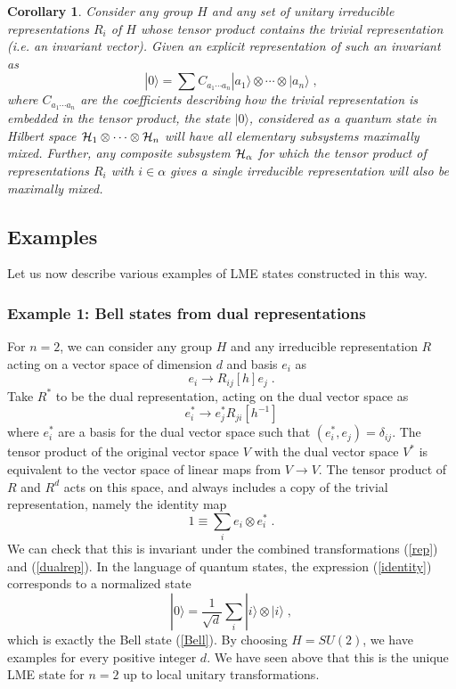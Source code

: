 \documentclass[12pt]{article}
\newtheorem{corollary}[theorem]{Corollary}
\theoremstyle{definition}
\newcommand{\be}{\begin{equation}}
\newcommand{\ee}{\end{equation}}
\begin{document}
\begin{corollary} \label{cor.genstates}
Consider any group $H$ and any set of unitary irreducible representations $R_i$ of $H$ whose tensor product contains the trivial representation (i.e. an invariant vector). Given an explicit representation of such an invariant as
\be
\label{genstates}
|0 \rangle = \sum C_{a_1 \cdots a_n} |a_1 \rangle \otimes \cdots \otimes | a_n \rangle \; ,
\ee
where $C_{a_1 \cdots a_n}$ are the coefficients describing how the trivial representation is embedded in the tensor product, the state $|0 \rangle$, considered as a quantum state in Hilbert space ${\cal H}_1 \otimes \cdots \otimes {\cal H}_n $ will have all elementary subsystems maximally mixed. Further, any composite subsystem ${\cal H}_{\alpha}$ for which the tensor product of representations $R_i$ with $i \in \alpha$ gives a single irreducible representation will also be maximally mixed.
\end{corollary}

\subsection{Examples}

Let us now describe various examples of LME states constructed in this way.

\subsubsection*{Example 1:  Bell states from dual representations}

For $n=2$, we can consider any group $H$ and any irreducible representation $R$ acting on a vector space of dimension $d$ and basis $e_i$ as
\be
\label{rep}
e_i \to R_{ij}[h] e_j \; .
\ee
Take $R^*$ to be the dual representation, acting on the dual vector space as
\be
\label{dualrep}
e^*_i \to  e^*_j R_{ji}[h^{-1}]
\ee
where $e^*_i$ are a basis for the dual vector space such that $(e^*_i, e_j) = \delta_{ij}$. The tensor product of the original vector space $V$ with the dual vector space $V^*$ is equivalent to the vector space of linear maps from $V \to V$. The tensor product of $R$ and $R^d$ acts on this space, and always includes a copy of the trivial representation, namely the identity map
\be
\label{identity}
1 \equiv \sum_i e_i \otimes e_i^* \; .
\ee
We can check that this is invariant under the combined transformations (\ref{rep}) and (\ref{dualrep}). In the language of quantum states, the expression (\ref{identity}) corresponds to a normalized state
\be
|0 \rangle = \frac{1}{\sqrt{d}} \sum_i |i \rangle \otimes |i \rangle \; ,
\ee
which is exactly the Bell state (\ref{Bell}). By choosing $H = SU(2)$, we have examples for every positive integer $d$. We have seen above that this is the unique LME state for $n=2$ up to local unitary transformations.
\end{document}
